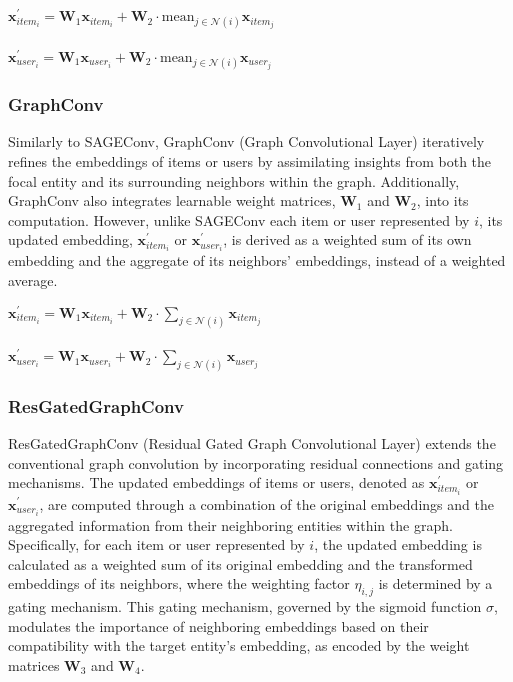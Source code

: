 \documentclass[bst/sn-nature]{sn-jnl}
\begin{document}
\begin{multicols}{2}
\begin{center}
    $\mathbf{x}^{\prime}_{item_{i}} = \mathbf{W}_1 \mathbf{x}_{item_{i}} + \mathbf{W}_2 \cdot \mathrm{mean}_{j \in \mathcal{N}(i)} \mathbf{x}_{item_{j}}$ \\~\\
    $\mathbf{x}^{\prime}_{user_{i}} = \mathbf{W}_1 \mathbf{x}_{user_{i}} + \mathbf{W}_2 \cdot \mathrm{mean}_{j \in \mathcal{N}(i)} \mathbf{x}_{user_{j}}$
\end{center}

\subsubsection{GraphConv\cite{graphconv}} 

\quad Similarly to SAGEConv, GraphConv (Graph Convolutional Layer) iteratively refines the embeddings of items or users by assimilating insights from both the focal entity and its surrounding neighbors within the graph. Additionally, GraphConv also integrates learnable weight matrices, $\mathbf{W}_1$ and $\mathbf{W}_2$, into its computation. However, unlike SAGEConv each item or user represented by $i$, its updated embedding, $\mathbf{x}^{\prime}_{item_i}$ or $\mathbf{x}^{\prime}_{user_i}$, is derived as a weighted sum of its own embedding and the aggregate of its neighbors' embeddings, instead of a weighted average. \\ 

\begin{center}
    $\mathbf{x}^{\prime}_{item_{i}} = \mathbf{W}_1 \mathbf{x}_{item_{i}} + \mathbf{W}_2 \cdot \sum_{j \in \mathcal{N}(i)} \mathbf{x}_{item_{j}}$ \\~\\
    $\mathbf{x}^{\prime}_{user_{i}} = \mathbf{W}_1 \mathbf{x}_{user_{i}} + \mathbf{W}_2 \cdot \sum_{j \in \mathcal{N}(i)} \mathbf{x}_{user_{j}}$
\end{center}

\subsubsection{ResGatedGraphConv\cite{resgatedgraphconv}} 

\quad ResGatedGraphConv (Residual Gated Graph Convolutional Layer) extends the conventional graph convolution by incorporating residual connections and gating mechanisms. The updated embeddings of items or users, denoted as $\mathbf{x}^{\prime}_{item_i}$ or $\mathbf{x}^{\prime}_{user_i}$, are computed through a combination of the original embeddings and the aggregated information from their neighboring entities within the graph. Specifically, for each item or user represented by $i$, the updated embedding is calculated as a weighted sum of its original embedding and the transformed embeddings of its neighbors, where the weighting factor $\eta_{i,j}$ is determined by a gating mechanism. This gating mechanism, governed by the sigmoid function $\sigma$, modulates the importance of neighboring embeddings based on their compatibility with the target entity's embedding, as encoded by the weight matrices $\mathbf{W}_3$ and $\mathbf{W}_4$. \\ 


\end{multicols}
\end{document}
